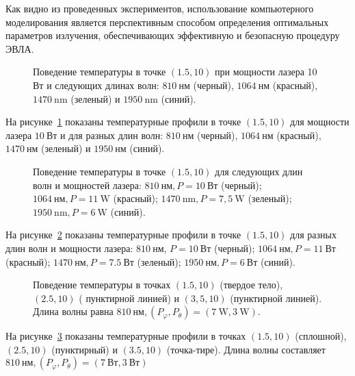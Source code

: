 Как видно из проведенных экспериментов, использование компьютерного
моделирования является перспективным способом определения оптимальных
параметров излучения, обеспечивающих эффективную и безопасную процедуру ЭВЛА.


\begin{figure}[h!t]
    \caption{Поведение температуры в точке $(1.5,10)$
        при мощности лазера 10 $\mathrm{Вт}$ и следующих длинах волн:
        $810 \mathrm{~нм}$ (черный), $1064 \mathrm{~нм}$ (красный),
        $1470 \mathrm{~nm}$ (зеленый) и $1950 \mathrm{~nm}$ (синий).}
    \label{fig:4_3:4}
\end{figure}
На рисунке~\ref{fig:4_3:4} показаны температурные профили
в точке $(1.5, 10)$ для мощности лазера
$10 \mathrm{~Вт}$ и для разных длин волн: $810 \mathrm{~нм}$ (черный),
$1064 \mathrm{~нм}$ (красный), $1470 \mathrm{~нм}$
(зеленый) и $1950 \mathrm{~нм}$ (синий).

\begin{figure}[h!t]
    \caption{Поведение температуры в точке $(1.5,10)$
        для следующих длин волн и мощностей лазера:
        $810 \mathrm{~нм}, P=10 \mathrm{~Вт}$ (черный);
        $1064 \mathrm{~нм}, P=11 \mathrm{~W}$ (красный);
        $1470 \mathrm{~nm}, P=7,5 \mathrm{~W}$ (зеленый);
        $1950 \mathrm{~nm}, P=6 \mathrm{~W}$ (синий).}
    \label{fig:4_3:5}
\end{figure}
На рисунке~\ref{fig:4_3:5} показаны температурные профили в точке $(1.5,10)$ для разных
длин волн и мощности лазера: $810 \mathrm{~нм}$, $P=10 \mathrm{~Вт}$
(черный); $1064 \mathrm{~нм}, P=11 \mathrm{~Вт}$ (красный);
$1470 \mathrm{~нм}, P=7.5 \mathrm{~Вт}$ (зеленый);
$1950 \mathrm{~нм}, P=6 \mathrm{~Вт}$ (синий).


\begin{figure}[h!t]
    \caption{Поведение температуры в точках $(1.5,10)$ (твердое тело),
        $(2.5,10)$ ( пунктирной линией) и $(3,5,10)$ (пунктирной линией).
        Длина волны равна $810 \mathrm{~нм},\left(P_{\varphi},
        P_{\theta}\right)=(7 \mathrm{~W}, 3 \mathrm{~W})$.}
    \label{fig:4_3:6}
\end{figure}
На рисунке~\ref{fig:4_3:6} показаны температурные профили в точках $(1.5,10)$ (сплошной),
$(2.5,10)$ (пунктирный) и $(3.5,10)$ (точка-тире).
Длина волны составляет $810 \mathrm{~нм},\left(P_{\varphi},
P_{\theta}\right)=(7 \mathrm{~Вт}, 3 \mathrm{~Вт})$



